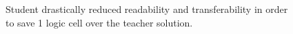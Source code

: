 
\begin{figure}[t]
    \centering
    \inputminted[frame=single]{systemverilog}{media/code/unreadable_opt.svh}
    \caption{Student drastically reduced readability and transferability in order to save 1 logic cell over the teacher solution.}
    \label{fig:unreadable_opt}
\end{figure}

